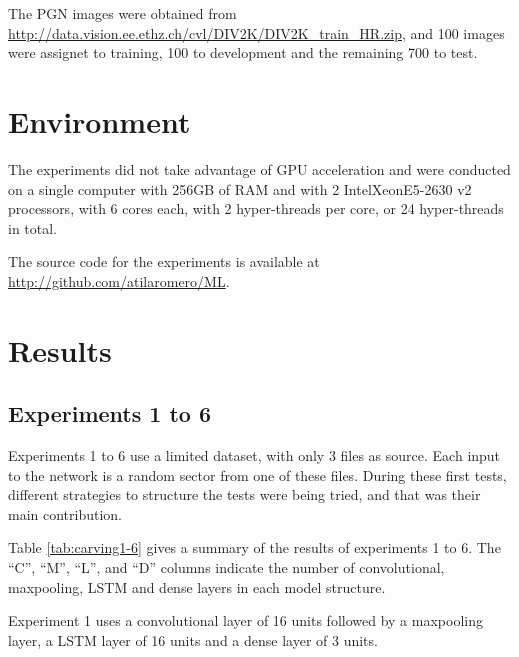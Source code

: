 The PGN images were obtained from \url{http://data.vision.ee.ethz.ch/cvl/DIV2K/DIV2K_train_HR.zip}, and 100 images were assignet to training, 100 to development and the remaining 700 to test.


\section{Environment}
The experiments did not take advantage of GPU acceleration and were  conducted on a single computer with 256GB of RAM and with 2 Intel\textregistered Xeon\textregistered E5-2630 v2 processors, with 6 cores each, with 2 hyper-threads per core, or 24 hyper-threads in total. 

The source code for the experiments is available at \url{http://github.com/atilaromero/ML}.

\section{Results}

\subsection{Experiments 1 to 6}

Experiments 1 to 6 use a limited dataset, with only 3 files as source. Each input to the network is a random sector from one of these files. During these first tests, different strategies to structure the tests were being tried, and that was their main contribution.

Table \ref{tab:carving1-6} gives a summary of the results of experiments 1 to 6. The ``C'', ``M'', ``L'', and ``D'' columns indicate the number of convolutional, maxpooling, LSTM and dense layers in each model structure.


Experiment 1 uses a convolutional layer of 16 units followed by a maxpooling layer, a LSTM layer of 16 units and a dense layer of 3 units.

